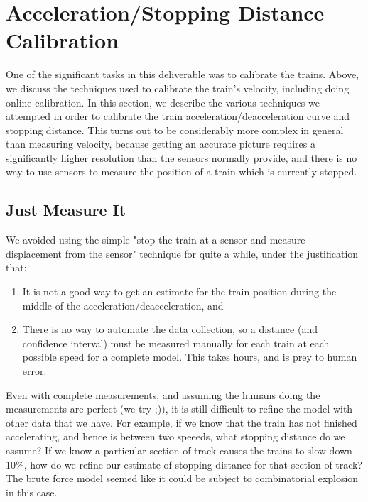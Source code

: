 \documentclass[titlepage]{article}
\begin{document}


\section{Acceleration/Stopping Distance Calibration}
One of the significant tasks in this deliverable was to calibrate the trains.
Above, we discuss the techniques used to calibrate the train's velocity,
including doing online calibration. In this section, we describe the various
techniques we attempted in order to calibrate the train
acceleration/deacceleration curve and stopping distance. This turns out to be
considerably more complex in general than measuring velocity, because getting
an accurate picture requires a significantly higher resolution than the sensors
normally provide, and there is no way to use sensors to measure the position of
a train which is currently stopped.

\subsection{Just Measure It}
We avoided using the simple "stop the train
at a sensor and measure displacement from the sensor" technique for quite a
while, under the justification that:
\begin{enumerate}
\item It is not a good way to get an estimate for the train position during
	the middle of the acceleration/deacceleration, and
\item There is no way to automate the data collection, so a distance (and
confidence interval) must be measured manually for each train at each possible
speed for a complete model. This takes hours, and is prey to human error.
\end{enumerate}
Even with complete measurements, and assuming the humans doing the measurements
are perfect (we try ;)), it is still difficult to refine the model with other
data that we have. For example, if we know that the train has not finished
accelerating, and hence is between two speeeds, what stopping distance do we
assume? If we know a particular section of track causes the trains to slow
down 10\%, how do we refine our estimate of stopping distance for that section
of track? The brute force model seemed like it could be subject to
combinatorial explosion in this case.
\end{document}
